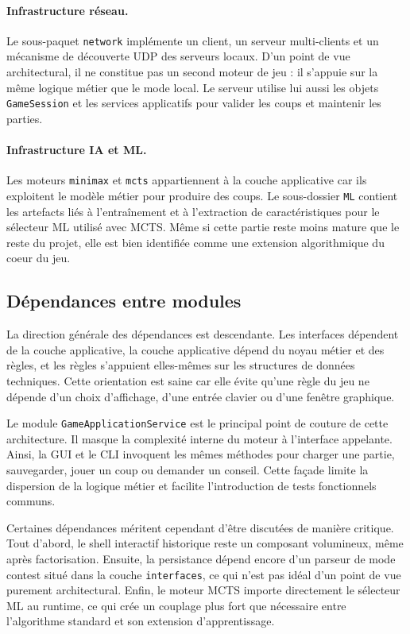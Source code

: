 \paragraph{Infrastructure réseau.}
Le sous-paquet \texttt{network} implémente un client, un serveur multi-clients
et un mécanisme de découverte UDP des serveurs locaux. D'un point de vue
architectural, il ne constitue pas un second moteur de jeu : il s'appuie sur
la même logique métier que le mode local. Le serveur utilise lui aussi les
objets \texttt{GameSession} et les services applicatifs pour valider les coups
et maintenir les parties.

\paragraph{Infrastructure IA et ML.}
Les moteurs \texttt{minimax} et \texttt{mcts} appartiennent à la couche
applicative car ils exploitent le modèle métier pour produire des coups. Le
sous-dossier \texttt{ML} contient les artefacts liés à l'entraînement et à
l'extraction de caractéristiques pour le sélecteur ML utilisé avec MCTS.
Même si cette partie reste moins mature que le reste du projet, elle est bien
identifiée comme une extension algorithmique du coeur du jeu.

\subsection{Dépendances entre modules}

La direction générale des dépendances est descendante. Les interfaces
dépendent de la couche applicative, la couche applicative dépend du noyau
métier et des règles, et les règles s'appuient elles-mêmes sur les structures
de données techniques. Cette orientation est saine car elle évite qu'une règle
du jeu ne dépende d'un choix d'affichage, d'une entrée clavier ou d'une
fenêtre graphique.

Le module \texttt{GameApplicationService} est le principal point de couture de
cette architecture. Il masque la complexité interne du moteur à l'interface
appelante. Ainsi, la GUI et le CLI invoquent les mêmes méthodes pour charger
une partie, sauvegarder, jouer un coup ou demander un conseil. Cette façade
limite la dispersion de la logique métier et facilite l'introduction de tests
fonctionnels communs.

Certaines dépendances méritent cependant d'être discutées de manière critique.
Tout d'abord, le shell interactif historique reste un composant volumineux,
même après factorisation. Ensuite, la persistance dépend encore d'un parseur
de mode contest situé dans la couche \texttt{interfaces}, ce qui n'est pas
idéal d'un point de vue purement architectural. Enfin, le moteur MCTS importe
directement le sélecteur ML au runtime, ce qui crée un couplage plus fort que
nécessaire entre l'algorithme standard et son extension d'apprentissage.

